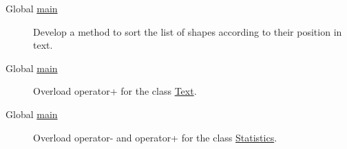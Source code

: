 \label{todo__todo000001}
\hypertarget{todo__todo000001}{}
 \begin{description}
\item[Global \hyperlink{main_8cpp_bf9e6b7e6f15df4b525a2e7705ba3089}{main} ]Develop a method to sort the list of shapes according to their position in text. \end{description}


\label{todo__todo000001}
\hypertarget{todo__todo000001}{}
 \begin{description}
\item[Global \hyperlink{main_8cpp_bf9e6b7e6f15df4b525a2e7705ba3089}{main} ]Overload operator+ for the class \hyperlink{class_text}{Text}. \end{description}


\label{todo__todo000001}
\hypertarget{todo__todo000001}{}
 \begin{description}
\item[Global \hyperlink{main_8cpp_bf9e6b7e6f15df4b525a2e7705ba3089}{main} ]Overload operator- and operator+ for the class \hyperlink{class_statistics}{Statistics}.

\end{description}

